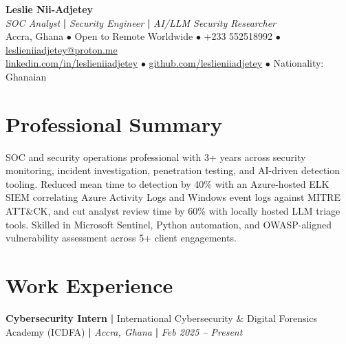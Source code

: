 \documentclass[letterpaper,11pt]{article}
\begin{document}

\begin{center}
  {\LARGE \textbf{Leslie Nii-Adjetey}} \\[4pt]
  \textit{SOC Analyst} \textbf{|} \textit{Security Engineer} \textbf{|} \textit{AI/LLM Security Researcher} \\[4pt]
  Accra, Ghana $\bullet$ Open to Remote Worldwide $\bullet$ +233 552518992 $\bullet$ \href{mailto:leslieniiadjetey@proton.me}{leslieniiadjetey@proton.me} \\
  \href{https://linkedin.com/in/leslieniiadjetey}{linkedin.com/in/leslieniiadjetey} $\bullet$
  \href{https://github.com/leslieniiadjetey}{github.com/leslieniiadjetey} $\bullet$
  Nationality: Ghanaian
\end{center}

\vspace{4pt}

\section{Professional Summary}

SOC and security operations professional with 3+ years across security monitoring, incident
investigation, penetration testing, and AI-driven detection tooling. Reduced mean time to
detection by 40\% with an Azure-hosted ELK SIEM correlating Azure Activity Logs and Windows
event logs against MITRE ATT\&CK, and cut analyst review time by 60\% with locally hosted LLM
triage tools. Skilled in Microsoft Sentinel, Python automation, and OWASP-aligned vulnerability
assessment across 5+ client engagements.

\section{Work Experience}

\noindent
\textbf{Cybersecurity Intern} \textbf{|} International Cybersecurity \& Digital Forensics Academy (ICDFA) \textbf{|}
\textit{Accra, Ghana} \textbf{|} \textit{Feb 2025 -- Present}
\end{document}
